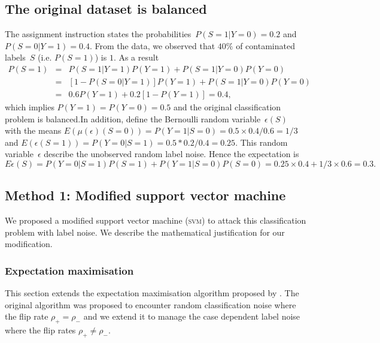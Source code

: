 \documentclass{article} %
\begin{document}
\subsection{The original dataset is balanced} \label{sec:1}
The assignment instruction states the probabilities~$P(S=1|Y=0)=0.2$ and $P(S=0|Y=1)=0.4$. From the data, we observed that $40\%$ of contaminated labels~$S$ (i.e. $P(S=1)$) is $1$. As a result
\begin{eqnarray*}
P(S=1)&=&P(S=1|Y=1)P(Y=1)+P(S=1|Y=0)P(Y=0)\\
     &=&\left[1-P(S=0|Y=1)\right]P(Y=1)+P(S=1|Y=0)P(Y=0)\\
     &=&0.6P(Y=1)+0.2\left[1-P(Y=1)\right]=0.4, \nonumber
\end{eqnarray*}
which implies $P(Y=1)=P(Y=0)=0.5$ and the original classification problem is balanced.In addition, define the Bernoulli random variable~$\epsilon(S)$ with the means $E(\mu(\epsilon)(S=0))=P(Y=1|S=0)=0.5\times0.4/0.6=1/3$ and $E(\epsilon(S=1))=P(Y=0|S=1)=0.5*0.2/0.4=0.25$. This random variable~$\epsilon$ describe the unobserved random label noise. Hence the expectation is
\begin{equation}
    E\epsilon(S)=P(Y=0|S=1)P(S=1)+P(Y=1|S=0)P(S=0)=0.25\times 0.4+1/3\times0.6=0.3.\label{eq:exp}
\end{equation}
\subsection{Method 1: Modified support vector machine}
We proposed a modified support vector machine (\textsc{svm}) to attack this classification problem with label noise. We describe the mathematical justification for our modification.
\subsubsection{Expectation maximisation}
This section extends the expectation maximisation algorithm proposed by \citet{pmlr-v20-biggio11}. The original algorithm was proposed to encounter random classification noise where the flip rate $\rho_+=\rho_-$ and we extend it to manage the case dependent label noise where the flip rates $\rho_+\neq\rho_-$.
\end{document}
